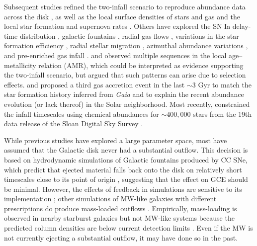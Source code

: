 \documentclass[twocolumn,twocolappendix,linenumbers]{aastex631}
\begin{document}
Subsequent studies refined the two-infall scenario to reproduce abundance data across the disk \citep[e.g.,][]{chiappini_abundance_2001,chiappini_oxygen_2003}, as well as the local surface densities of stars and gas and the local star formation and supernova rates \citep[e.g.,][]{romano_mass_2000,spitoni_galactic_2020,spitoni_remind_2024}. Others have explored the SN Ia delay-time distribution \citep{matteucci_effect_2009,palicio_analytic_2023}, galactic fountains \citep{spitoni_effects_2009}, radial gas flows \citep{spitoni_effects_2011,palla_chemical_2020}, variations in the star formation efficiency \citep{spitoni_effects_2011,palla_chemical_2020}, radial stellar migration \citep{spitoni_effect_2015,palla_mgfe_2022}, azimuthal abundance variations \citep{spitoni_2d_2019}, and pre-enriched gas infall \citep{palla_chemical_2020,spitoni_remind_2024}. \citet{nissen_high-precision_2020} and \citet{nataf_accurate_2024} observed multiple sequences in the local age--metallicity relation (AMR), which could be interpreted as evidence supporting the two-infall scenario, but \citet{plotnikova_chemical_2024} argued that such patterns can arise due to selection effects. \citet{spitoni_beyond_2023} and \citet{palla_mapping_2024} proposed a third gas accretion event in the last $\sim3$ Gyr to match the star formation history inferred from {\it Gaia} \citep{ruiz-lara_recurrent_2020} and to explain the recent abundance evolution (or lack thereof) in the Solar neighborhood. Most recently, \citet{hegedus_reconstructing_2025} constrained the infall timescales using chemical abundances for $\sim400,000$ stars from the 19th data release of the Sloan Digital Sky Survey \citep[SDSS;][]{sdss_collaboration_nineteenth_2025}.

While previous studies have explored a large parameter space, most have assumed that the Galactic disk never had a substantial outflow. This decision is based on hydrodynamic simulations of Galactic fountains produced by CC SNe, which predict that ejected material falls back onto the disk on relatively short timescales \citep{spitoni_galactic_2008,spitoni_effects_2009} close to its point of origin \citep{melioli_hydrodynamical_2008,melioli_hydrodynamical_2009}, suggesting that the effect on GCE should be minimal. However, the effects of feedback in simulations are sensitive to its implementation \citep[e.g.,][]{li_effects_2020,hu_code_2023}; other simulations of MW-like galaxies with different prescriptions do produce mass-loaded outflows \citep[e.g.,][]{brook_hierarchical_2011,gutcke_nihao_2017,nelson_first_2019,peschken_angular_2021,kopenhafer_seeking_2023}. Empirically, mass-loading is observed in nearby starburst galaxies \citep[e.g.,][]{lopez_temperature_2020,cameron_duvet_2021,lopez_x-ray_2023} but not MW-like systems because the predicted column densities are below current detection limits \citep[see reviews by][]{veilleux_cool_2020,thompson_theory_2024}. Even if the MW is not currently ejecting a substantial outflow, it may have done so in the past.
\end{document}
